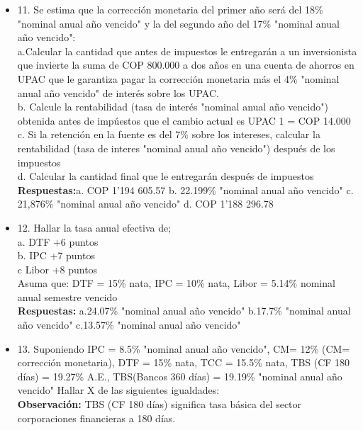 \begin{itemize}
 \item 11. Se estima que la corrección monetaria del primer año será del 18\% "nominal anual año vencido" y la del segundo año del 17\% "nominal anual año vencido":\\
       a.Calcular la cantidad que antes de impuestos le entregarán a un inversionista que invierte la suma de COP 800.000 a dos años en una cuenta de ahorros en UPAC que le garantiza pagar la corrección monetaria más el 4\% "nominal anual año vencido" de interés sobre los UPAC.\\
       b. Calcule la rentabilidad (tasa de interés "nominal anual año vencido") obtenida antes de impúestos que el cambio actual es UPAC 1 = COP 14.000\\
       c. Si la retención en la fuente es del 7\% sobre los intereses, calcular la rentabilidad (tasa de interes "nominal anual año vencido") después de los impuestos\\
       d. Calcular la cantidad final que le entregarán después de impuestos\\
       \textbf{Respuestas:}a. COP 1'194 605.57 \hspace{0,5cm} b. 22.199\% "nominal anual año vencido"\hspace{0,5cm} c. 21,876\% "nominal anual año vencido"\hspace{0,5cm} d. COP 1'188 296.78\\
       \medskip

 \item 12. Hallar la tasa anual efectiva de;\\
       a. DTF +6 puntos\\
       b. IPC +7 puntos\\
       c Libor +8 puntos\\
       Asuma que: DTF = 15\% nata, IPC = 10\% nata, Libor = 5.14\% nominal anual semestre vencido\\
       \textbf{Respuestas:} a.24.07\% "nominal anual año vencido"\hspace{0,5cm} b.17.7\% "nominal anual año vencido"\hspace{0,5cm} c.13.57\% "nominal anual año vencido"\\
       \medskip

 \item 13. Suponiendo IPC = 8.5\% "nominal anual año vencido", CM= 12\% (CM= corrección monetaria), DTF = 15\% nata, TCC = 15.5\% nata, TBS (CF 180 días) = 19.27\% A.E., TBS(Bancos 360 días) = 19.19\% "nominal anual año vencido" Hallar X de las siguientes igualdades:\\
       \textbf{Observación:} TBS (CF 180 días) significa tasa básica del sector corporaciones financieras a 180 días.\\


\end{itemize}
